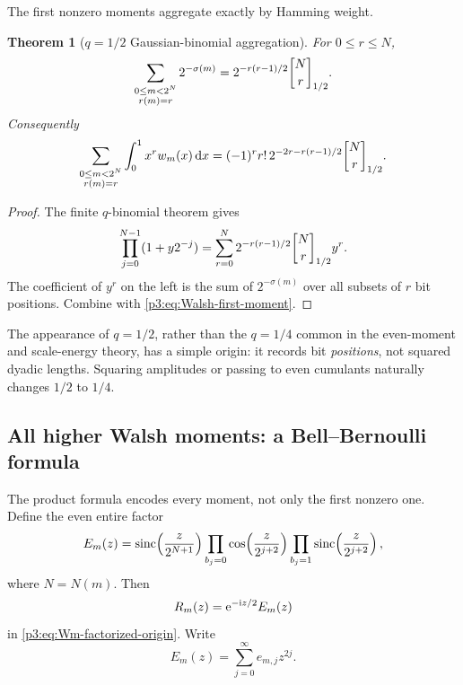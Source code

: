 \documentclass[11pt]{article}
\newtheorem{theorem}{Theorem}[section]
\theoremstyle{definition}
\theoremstyle{remark}
\newcommand{\dd}{\,\mathrm d}
\begin{document}
The first nonzero moments aggregate exactly by Hamming weight.

\begin{theorem}[$q=1/2$ Gaussian-binomial aggregation]
\label{p3:thm:qbinom-Walsh}
For $0\le r\le N$,
\begin{equation}\label{p3:eq:sigma-qbinom}
 \sum_{\substack{0\le m<2^N\\r(m)=r}}2^{-\sigma(m)}
 =2^{-r(r-1)/2}\qbinom{N}{r}{1/2}.
\end{equation}
Consequently
\begin{equation}\label{p3:eq:first-moment-qbinom}
 \sum_{\substack{0\le m<2^N\\r(m)=r}}
 \int_0^1x^rw_m(x)\dd x
 =(-1)^rr!\,2^{-2r-r(r-1)/2}\qbinom{N}{r}{1/2}.
\end{equation}
\end{theorem}

\begin{proof}
The finite $q$-binomial theorem gives
\[
 \prod_{j=0}^{N-1}(1+y2^{-j})
 =\sum_{r=0}^N2^{-r(r-1)/2}\qbinom{N}{r}{1/2}y^r.
\]
The coefficient of $y^r$ on the left is the sum of $2^{-\sigma(m)}$ over
all subsets of $r$ bit positions.  Combine with
\eqref{p3:eq:Walsh-first-moment}.
\end{proof}

The appearance of $q=1/2$, rather than the $q=1/4$ common in the even-moment
and scale-energy theory, has a simple origin: it records bit \emph{positions},
not squared dyadic lengths.  Squaring amplitudes or passing to even cumulants
naturally changes $1/2$ to $1/4$.

\subsection{All higher Walsh moments: a Bell--Bernoulli formula}

The product formula encodes every moment, not only the first nonzero one.
Define the even entire factor
\begin{equation}\label{p3:eq:Em-def}
 E_m(z)=
 \operatorname{sinc}\!\left(\frac{z}{2^{N+1}}\right)
 \prod_{b_j=0}\cos\!\left(\frac{z}{2^{j+2}}\right)
 \prod_{b_j=1}\operatorname{sinc}\!\left(\frac{z}{2^{j+2}}\right),
\end{equation}
where $N=N(m)$.  Then
\begin{equation}\label{p3:eq:R-m-E}
 R_m(z)=\mathrm e^{-\mathrm i z/2}E_m(z)
\end{equation}
in \eqref{p3:eq:Wm-factorized-origin}.  Write
\begin{equation}\label{p3:eq:E-coefficients}
 E_m(z)=\sum_{j=0}^\infty e_{m,j}z^{2j}.
\end{equation}
\end{document}
